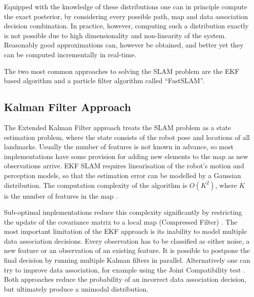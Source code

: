 Equipped with the knowledge of these distributions one can in
principle compute the exact posterior, by considering every possible
path, map and data association decision combination. In practice,
however, computing such a distribution exactly is not possible due to
high dimensionality and non-linearity of the system. Reasonably good
approximations can, however be obtained, and better yet they can be
computed incrementally in real-time.

The two most common approaches to solving the SLAM problem are the EKF
based algorithm and a particle filter algorithm called ``FastSLAM''.

\subsection{Kalman Filter Approach}
The Extended Kalman Filter approach treats the SLAM problem as a state
estimation problem, where the state consists of the robot pose and
locations of all landmarks. Usually the number of features is not
known in advance, so most implementations have some provision for
adding new elements to the map as new observations arrive. EKF SLAM
requires linearisation of the robot's motion and perception models, so
that the estimation error can be modelled by a Gaussian distribution.
The computation complexity of the algorithm is $O(K^2)$, where $K$ is
the number of features in the map \cite{ekf_slam}.

Sub-optimal implementations reduce this complexity significantly by
restricting the update of the covariance matrix to a local map
(Compressed Filter) \cite{williams:acra2001}. The most important
limitation of the EKF approach is its inability to model multiple data
association decisions. Every observation has to be classified as
either noise, a new feature or an observation of an existing feature.
It is possible to postpone the final decision by running multiple
Kalman filters in parallel. Alternatively one can try to improve data
association, for example using the Joint Compatibility test
\cite{neira01:_data_assoc_stoch_mappin_using}.  Both approaches reduce
the probability of an incorrect data association decision, but
ultimately produce a unimodal distribution.

